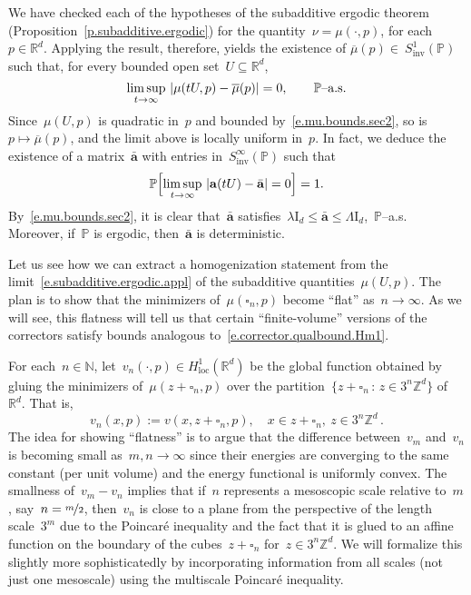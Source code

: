 \documentclass[11pt,twoside]{article} %
\let\oldsquare\square %
\renewcommand{\square}{\oldsquare}
\numberwithin{equation}{section}
\theoremstyle{definition}
\let\originalleft\left
\let\originalright\right
\renewcommand{\left}{\mathopen{}\mathclose\bgroup\originalleft}
\renewcommand{\right}{\aftergroup\egroup\originalright}
\newcommand*{\Id}{\ensuremath{\mathrm{I}_d}}
\newcommand*{\N}{\ensuremath{\mathbb{N}}}
\newcommand*{\Zd}{\ensuremath{\mathbb{Z}^d}}
\newcommand*{\Rd}{\ensuremath{\mathbb{R}^d}}
\renewcommand{\a}{\mathbf{a}}
\newcommand{\ahom}{\bar{\a}}
\newcommand{\cu}{\square}
\renewcommand{\P}{\mathbb{P}}
\begin{document}
We have checked each of the hypotheses of the subadditive ergodic theorem (Proposition~\ref{p.subadditive.ergodic}) for the quantity~$\nu = \mu(\cdot,p)$, for each~$p\in\Rd$. Applying the result, therefore, yields the existence of 
$\overline{\mu}(p) \in\ S^1_{\mathrm{inv}}(\P)$ such that, for every bounded open set~$U\subseteq \Rd$, 
\begin{equation}
\label{e.subadditive.ergodic.appl}
\limsup_{t\to\infty} \
\left| \mu(tU,p) - \overline{\mu}(p) \right| = 0, 
\qquad 
\mbox{$\P$--a.s.}
\end{equation}
Since~$\mu(U,p)$ is quadratic in~$p$ and bounded by~\eqref{e.mu.bounds.sec2}, so is~$p\mapsto \overline{\mu}(p)$, and the limit above is locally uniform in~$p$. In fact, we deduce the existence of a matrix~$\ahom$ with entries in~$S^\infty_{\mathrm{inv}}(\P)$ such that 
\begin{equation}
\label{e.conv.to.ahom}
\P \Bigl[ 
\limsup_{t\to\infty} \
\left| \a(tU) - \ahom \right| = 0
\Bigr] = 1.  
\end{equation}
By~\eqref{e.mu.bounds.sec2}, it is clear that~$\ahom$ satisfies~$\lambda  \Id \leq \ahom \leq \Lambda  \Id$,~$\P$--a.s.
Moreover, if~$\P$ is ergodic, then~$\ahom$ is deterministic. 

\smallskip

Let us see how we can extract a homogenization statement from the limit~\eqref{e.subadditive.ergodic.appl} of the subadditive quantities~$\mu(U,p)$. 
The plan is to show that the minimizers of~$\mu(\cu_n,p)$ become ``flat'' as~$n\to \infty$. As we will see, this flatness will tell us that certain ``finite-volume'' versions of the correctors satisfy bounds analogous to~\eqref{e.corrector.qualbound.Hm1}. 

For each~$n\in\N$, let~$v_n(\cdot,p) \in H^1_{\mathrm{loc}}(\Rd)$ be the global function obtained by gluing the minimizers of~$\mu(z+\cu_n,p)$ over the partition~$\{ z+\cu_n \,:\, z\in 3^n\Zd \}$ of~$\Rd$. That is, 
\begin{equation*}
v_n(x,p) := 
v(x,z+\cu_n,p), \quad x \in z+\cu_n, \ z\in3^n\Zd\,.
\end{equation*}
The idea for showing ``flatness'' is to argue that the difference between~$v_m$ and~$v_n$ is becoming small as~$m,n\to \infty$ since their energies are converging to the same constant (per unit volume) and the energy functional is uniformly convex. 
The smallness of~$v_m - v_n$ implies that if~$n$ represents a mesoscopic scale relative to~$m$, say~$n=\nicefrac m2$, then~$v_n$ is close to a plane from the perspective of the length scale~$3^m$ due to the Poincar\'e inequality and the fact that it is glued to an affine function on the boundary of the cubes~$z+\cu_n$ for~$z\in 3^n\Zd$. We will formalize this slightly more sophisticatedly by incorporating information from all scales (not just one mesoscale) using the multiscale Poincar\'e inequality. 
\end{document}
